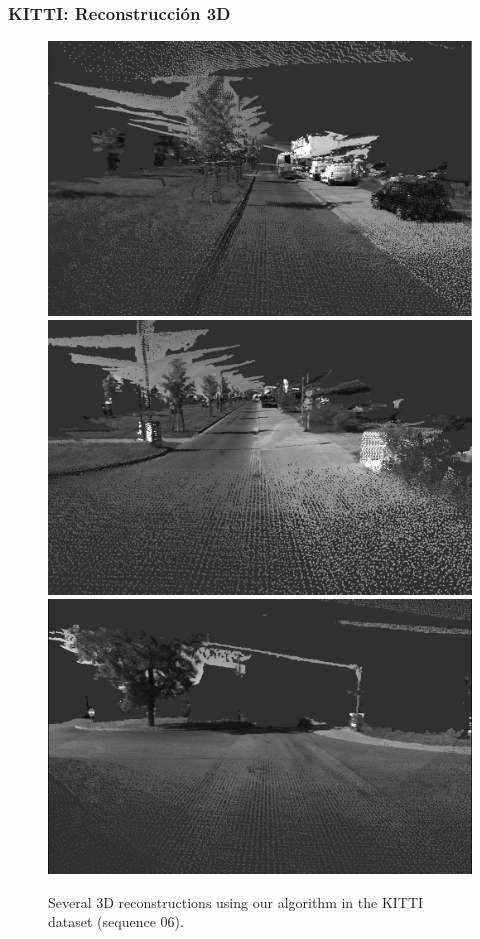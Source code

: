 \documentclass[compress]{beamer}
\begin{document}
\begin{frame}
	\frametitle{KITTI: Reconstrucción 3D}
\begin{figure}[!htb]
	\centering
	{\includegraphics[width=0.32\columnwidth]{./images/kitti_3d_1}%
		\label{kitti_3d_1}}
	\hfil
	{\includegraphics[width=0.32\columnwidth]{./images/kitti_3d_2}%
		\label{kitti_3d_2}}
	\hfil
	{\includegraphics[width=0.32\columnwidth]{./images/kitti_3d_3}%
		\label{kitti_3d_3}}
	\\
	\caption{Several 3D reconstructions using our algorithm in the KITTI dataset (sequence 06).}
	\label{fig:kitti_reconstructions}
\end{figure}
\end{frame}
\end{document}
